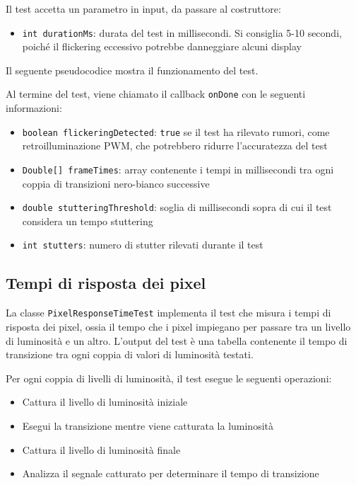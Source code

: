 Il test accetta un parametro in input, da passare al costruttore:\begin{itemize}
	\item \texttt{int durationMs}: durata del test in millisecondi. Si consiglia 5-10 secondi, poiché il flickering eccessivo potrebbe danneggiare alcuni display
\end{itemize}

Il seguente pseudocodice mostra il funzionamento del test.


Al termine del test, viene chiamato il callback \texttt{onDone} con le seguenti informazioni:\begin{itemize}
	\item \texttt{boolean flickeringDetected}: \texttt{true} se il test ha rilevato rumori, come retroilluminazione PWM, che potrebbero ridurre l'accuratezza del test
	\item \texttt{Double[] frameTimes}: array contenente i tempi in millisecondi tra ogni coppia di transizioni nero-bianco successive
	\item \texttt{double stutteringThreshold}: soglia di millisecondi sopra di cui il test considera un tempo stuttering
	\item \texttt{int stutters}: numero di stutter rilevati durante il test
\end{itemize}

\subsection{Tempi di risposta dei pixel}
La classe \texttt{PixelResponseTimeTest} implementa il test che misura i tempi di risposta dei pixel, ossia il tempo che i pixel impiegano per passare tra un livello di luminosità e un altro. L'output del test è una tabella contenente il tempo di transizione tra ogni coppia di valori di luminosità testati.

Per ogni coppia di livelli di luminosità, il test esegue le seguenti operazioni:\begin{itemize}
	\item Cattura il livello di luminosità iniziale
	\item Esegui la transizione mentre viene catturata la luminosità
	\item Cattura il livello di luminosità finale
	\item Analizza il segnale catturato per determinare il tempo di transizione
\end{itemize}

